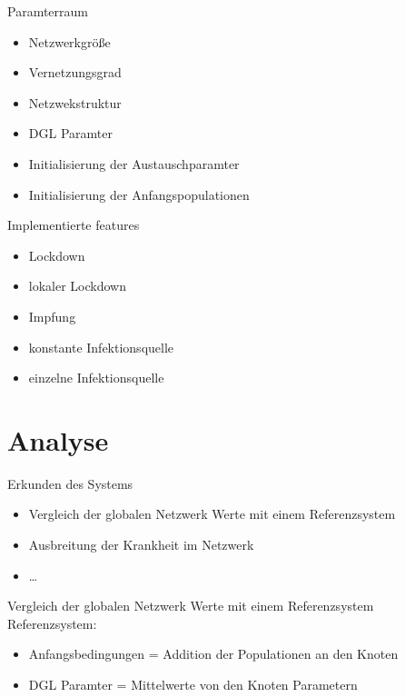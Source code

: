     \begin{frame}{Paramterraum}
        \begin{itemize}
            \item Netzwerkgröße
            \item Vernetzungsgrad
            \item Netzwekstruktur
            \item DGL Paramter
            \item Initialisierung der Austauschparamter
            \item Initialisierung der Anfangspopulationen
        \end{itemize}
    \end{frame}
    
    
    \begin{frame}{Implementierte features}
        \begin{itemize}
            \item Lockdown
            \item lokaler Lockdown
            \item Impfung
            \item konstante Infektionsquelle
            \item einzelne Infektionsquelle 
        \end{itemize}
    \end{frame}

    \section{Analyse}
    
    \begin{frame}{Erkunden des Systems}
        \begin{itemize}
            \item Vergleich der globalen Netzwerk Werte mit einem Referenzsystem
            \item Ausbreitung der Krankheit im Netzwerk
            \item \dots
        \end{itemize}
    \end{frame}
    
    
    \begin{frame}{Vergleich der globalen Netzwerk Werte mit einem Referenzsystem}
    Referenzsystem: 
    \begin{itemize}
        \item Anfangsbedingungen \newline 
        = Addition der Populationen an den Knoten
        \item DGL Paramter \newline 
        =  Mittelwerte von den Knoten Parametern 
    \end{itemize}
    \end{frame}

